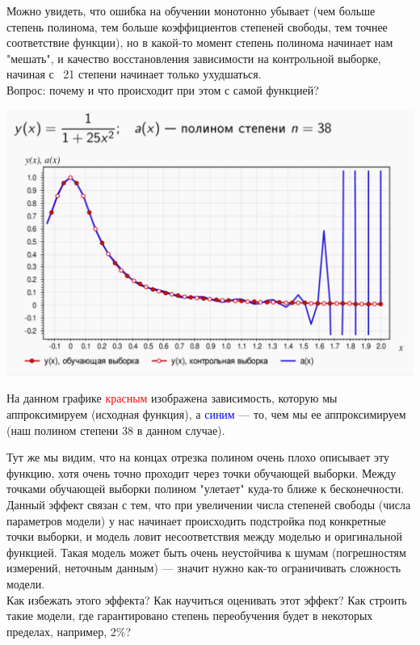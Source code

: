 \documentclass{article}
\begin{document}
Можно увидеть, что ошибка на обучении монотонно убывает (чем больше степень полинома, тем больше коэффициентов степеней свободы, тем точнее соответствие функции), но в какой-то момент степень полинома начинает нам "мешать", и качество восстановления зависимости на контрольной выборке, начиная с ~21 степени начинает только ухудшаться.
\\

Вопрос: почему и что происходит при этом с самой функцией?

\begin{center}
    \includegraphics[scale=0.395]{images/2_5.png}
\end{center}

На данном графике \textcolor{red}{красным} изображена зависимость, которую мы аппроксимируем (исходная функция), а \textcolor{blue}{синим} --- то, чем мы ее аппроксимируем (наш полином степени 38 в данном случае).

Тут же мы видим, что на концах отрезка полином очень плохо описывает эту функцию, хотя очень точно проходит через точки обучающей выборки. Между точками обучающей выборки полином "улетает" куда-то ближе к бесконечности.
\\

Данный эффект связан с тем, что при увеличении числа степеней свободы (числа параметров модели) у нас начинает происходить подстройка под конкретные точки выборки, и модель ловит несоответствия между моделью и оригинальной функцией. Такая модель может быть очень неустойчива к шумам (погрешностям измерений, неточным данным) --- значит нужно как-то ограничивать сложность модели.
\\

Как избежать этого эффекта? Как научиться оценивать этот эффект? Как строить такие модели, где гарантировано степень переобучения будет в некоторых пределах, например, 2\%?
\end{document}
